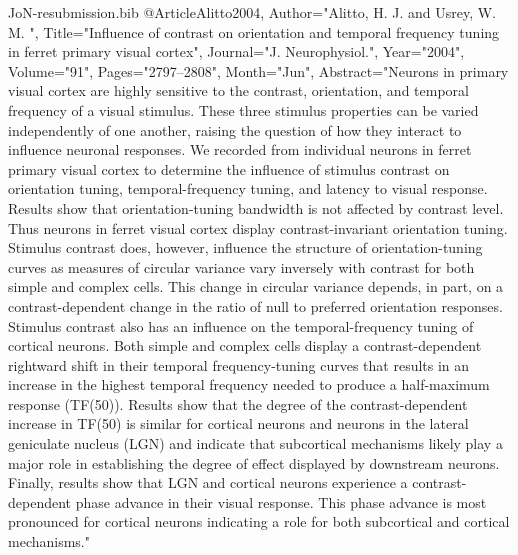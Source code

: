 \documentclass{article}
\begin{document}
\begin{filecontents}{JoN-resubmission.bib}
@Article{Alitto2004,
   Author="Alitto, H. J. and Usrey, W. M. ",
   Title="{{I}nfluence of contrast on orientation and temporal frequency tuning in ferret primary visual cortex}",
   Journal="J. Neurophysiol.",
   Year="2004",
   Volume="91",
   Pages="2797--2808",
   Month="Jun",
   Abstract="Neurons in primary visual cortex are highly sensitive to
the contrast, orientation, and temporal frequency of a visual
stimulus. These three stimulus properties can be varied independently
of one another, raising the question of how they interact to influence
neuronal responses. We recorded from individual neurons in ferret
primary visual cortex to determine the influence of stimulus contrast
on orientation tuning, temporal-frequency tuning, and latency to
visual response. Results show that orientation-tuning bandwidth is not
affected by contrast level. Thus neurons in ferret visual cortex
display contrast-invariant orientation tuning. Stimulus contrast does,
however, influence the structure of orientation-tuning curves as
measures of circular variance vary inversely with contrast for both
simple and complex cells. This change in circular variance depends, in
part, on a contrast-dependent change in the ratio of null to preferred
orientation responses. Stimulus contrast also has an influence on the
temporal-frequency tuning of cortical neurons. Both simple and complex
cells display a contrast-dependent rightward shift in their temporal
frequency-tuning curves that results in an increase in the highest
temporal frequency needed to produce a half-maximum response
(TF(50)). Results show that the degree of the contrast-dependent
increase in TF(50) is similar for cortical neurons and neurons in the
lateral geniculate nucleus (LGN) and indicate that subcortical
mechanisms likely play a major role in establishing the degree of
effect displayed by downstream neurons. Finally, results show that LGN
and cortical neurons experience a contrast-dependent phase advance in
their visual response. This phase advance is most pronounced for
cortical neurons indicating a role for both subcortical and cortical
mechanisms."  }


\end{filecontents}
\end{document}
